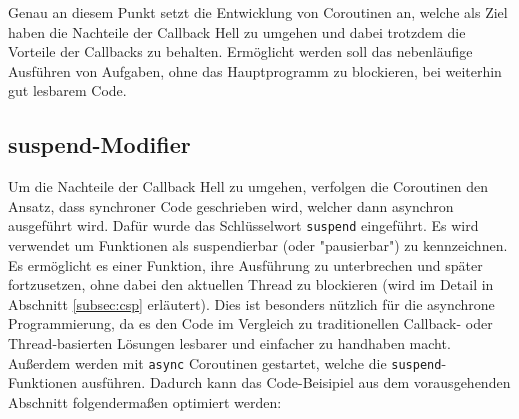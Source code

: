 \documentclass[fontsize=12pt,paper=a4,twoside=semi,parskip=half-,headsepline,headinclude]{scrreprt}
\begin{document}
Genau an diesem Punkt setzt die Entwicklung von Coroutinen an, welche als Ziel haben die Nachteile der Callback Hell zu umgehen und dabei trotzdem die Vorteile der Callbacks zu behalten\cite{Elizarov2017a}. Ermöglicht werden soll das nebenläufige Ausführen von Aufgaben, ohne das Hauptprogramm zu blockieren, bei weiterhin gut lesbarem Code.


\subsection{suspend-Modifier}
\label{subsec:suspend}

Um die Nachteile der Callback Hell zu umgehen, verfolgen die Coroutinen den Ansatz, dass synchroner Code geschrieben wird, welcher dann asynchron ausgeführt wird. Dafür wurde das Schlüsselwort \texttt{suspend} eingeführt\cite{Akhin2024}. Es wird verwendet um Funktionen als suspendierbar (oder "pausierbar") zu kennzeichnen. Es ermöglicht es einer Funktion, ihre Ausführung zu unterbrechen und später fortzusetzen, ohne dabei den aktuellen Thread zu blockieren (wird im Detail in Abschnitt \ref{subsec:csp} erläutert). Dies ist besonders nützlich für die asynchrone Programmierung, da es den Code im Vergleich zu traditionellen Callback- oder Thread-basierten Lösungen lesbarer und einfacher zu handhaben macht. Außerdem werden mit \texttt{async} Coroutinen gestartet, welche die \texttt{suspend}-Funktionen ausführen. Dadurch kann das Code-Beisipiel aus dem vorausgehenden Abschnitt folgendermaßen optimiert werden:
\end{document}

